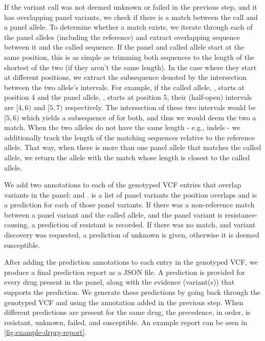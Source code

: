 If the variant call was not deemed unknown or failed in the previous step, and it has overlapping panel variants, we check if there is a match between the call and a panel allele. To determine whether a match exists, we iterate through each of the panel alleles (including the reference) and extract overlapping sequence between it and the called sequence. If the panel and called allele start at the same position, this is as simple as trimming both sequences to the length of the shortest of the two (if they aren't the same length). In the case where they start at different positions, we extract the subsequence denoted by the intersection between the two allele's intervals. For example, if the called allele, , starts at position 4 and the panel allele, , starts at position 5, their (half-open) intervals are $[4,6)$ and $[5,7)$ respectively. The intersection of these two intervals would be $[5,6)$ which yields a subsequence of  for both, and thus we would deem the two a match. When the two alleles do not have the same length - e.g., indels - we additionally track the length of the matching sequences relative to the reference allele. That way, when there is more than one panel allele that matches the called allele, we return the allele with the match whose length is closest to the called allele.

We add two annotations to each of the genotyped VCF entries that overlap variants in the panel:  and .  is a list of panel variants the position overlaps and  is a prediction for each of those panel variants. If there was a non-reference match between a panel variant and the called allele, and the panel variant is resistance-causing, a prediction of resistant is recorded. If there was no match, and variant discovery was requested, a prediction of unknown is given, otherwise it is deemed susceptible. 

After adding the prediction annotations to each entry in the genotyped VCF, we produce a final prediction report as a JSON file. A prediction is provided for every drug present in the panel, along with the evidence (variant(s)) that supports the prediction. We generate these predictions by going back through the genotyped VCF and using the  annotation added in the previous step. When different predictions are present for the same drug, the precedence, in order, is resistant, unknown, failed, and susceptible. An example report can be seen in \autoref{fig:example-drprg-report}.

